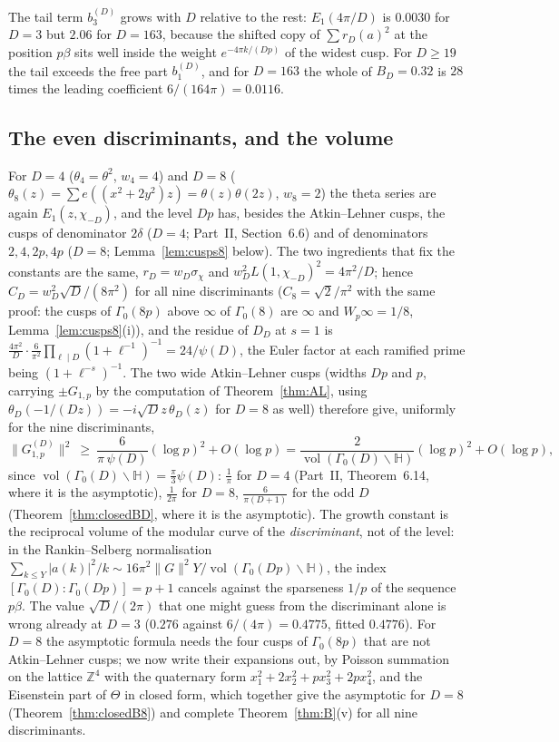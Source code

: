 \documentclass[11pt]{amsart}
\theoremstyle{remark}
\newcommand{\Z}{\mathbb{Z}}
\newcommand{\HH}{\mathbb{H}}
\DeclareMathOperator{\vol}{vol}
\begin{document}
The tail term $b_3^{(D)}$ grows with $D$ relative to the rest: $E_1(4\pi/D)$ is $0.0030$ for $D=3$ but $2.06$ for $D=163$, because the shifted copy of $\sum r_D(a)^2$ at the position $p\beta$ sits well inside the weight $e^{-4\pi k/(Dp)}$ of the widest cusp. For $D\ge19$ the tail exceeds the free part $b_1^{(D)}$, and for $D=163$ the whole of $B_D=0.32$ is $28$ times the leading coefficient $6/(164\pi)=0.0116$.

\subsection{The even discriminants, and the volume}\label{subsec:even}
For $D=4$ ($\theta_4=\theta^2$, $w_4=4$) and $D=8$ ($\theta_8(z)=\sum e((x^2+2y^2)z)=\theta(z)\theta(2z)$, $w_8=2$) the theta series are again $E_1(z,\chi_{-D})$, and the level $Dp$ has, besides the Atkin--Lehner cusps, the cusps of denominator $2\delta$ ($D=4$; Part~II, Section~6.6) and of denominators $2,4,2p,4p$ ($D=8$; Lemma~\ref{lem:cusps8} below). The two ingredients that fix the constants are the same, $r_D=w_D\sigma_\chi$ and $w_D^2L(1,\chi_{-D})^2=4\pi^2/D$; hence $C_D=w_D^2\sqrt D/(8\pi^2)$ for all nine discriminants ($C_8=\sqrt2/\pi^2$ with the same proof: the cusps of $\Gamma_0(8p)$ above $\infty$ of $\Gamma_0(8)$ are $\infty$ and $W_p\infty=1/8$, Lemma~\ref{lem:cusps8}(i)), and the residue of $D_D$ at $s=1$ is $\frac{4\pi^2}D\cdot\frac6{\pi^2}\prod_{\ell\mid D}(1+\ell^{-1})^{-1}=24/\psi(D)$, the Euler factor at each ramified prime being $(1+\ell^{-s})^{-1}$. The two wide Atkin--Lehner cusps (widths $Dp$ and $p$, carrying $\pm G_{1,p}$ by the computation of Theorem~\ref{thm:AL}, using $\theta_D(-1/(Dz))=-i\sqrt Dz\,\theta_D(z)$ for $D=8$ as well) therefore give, uniformly for the nine discriminants,
\[
\|G^{(D)}_{1,p}\|^2\ \ge\ \frac{6}{\pi\,\psi(D)}(\log p)^2+O(\log p)=\frac{2}{\vol(\Gamma_0(D)\backslash\HH)}(\log p)^2+O(\log p),
\]
since $\vol(\Gamma_0(D)\backslash\HH)=\frac\pi3\psi(D)$: $\frac1\pi$ for $D=4$ (Part~II, Theorem~6.14, where it is the asymptotic), $\frac1{2\pi}$ for $D=8$, $\frac6{\pi(D+1)}$ for the odd $D$ (Theorem~\ref{thm:closedBD}, where it is the asymptotic). The growth constant is the reciprocal volume of the modular curve of the \emph{discriminant}, not of the level: in the Rankin--Selberg normalisation $\sum_{k\le Y}|a(k)|^2/k\sim16\pi^2\|G\|^2Y/\vol(\Gamma_0(Dp)\backslash\HH)$, the index $[\Gamma_0(D):\Gamma_0(Dp)]=p+1$ cancels against the sparseness $1/p$ of the sequence $p\beta$. The value $\sqrt D/(2\pi)$ that one might guess from the discriminant alone is wrong already at $D=3$ ($0.276$ against $6/(4\pi)=0.4775$, fitted $0.4776$). For $D=8$ the asymptotic formula needs the four cusps of $\Gamma_0(8p)$ that are not Atkin--Lehner cusps; we now write their expansions out, by Poisson summation on the lattice $\Z^4$ with the quaternary form $x_1^2+2x_2^2+px_3^2+2px_4^2$, and the Eisenstein part of $\Theta$ in closed form, which together give the asymptotic for $D=8$ (Theorem~\ref{thm:closedB8}) and complete Theorem~\ref{thm:B}(v) for all nine discriminants.
\end{document}
